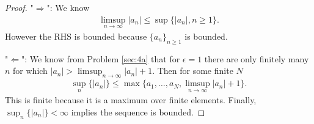 \documentclass[11pt,letterpaper]{article}
\begin{document}
\begin{proof}
"$\Rightarrow$": We know 
\begin{align*}
    \limsup_{n\to\infty} |a_n| \leq \sup \{|a_n|, n\geq 1\}.
\end{align*}
However the RHS is bounded because $\{a_n\}_{n\geq 1}$ is bounded.

"$\Leftarrow$": We know from Problem \ref{sec:4a} that for $\epsilon = 1$ there are only finitely many $n$ for which $|a_n|>\limsup_{n\to\infty} |a_n|+1$. Then for some finite $N$
\begin{align}
    \sup_{n} \{|a_n|\} \leq \max\{a_1,\dots,a_N,\limsup_{n\to\infty} |a_n|+1\}.
\end{align}
This is finite because it is a maximum over finite elements. Finally, $\sup_{n} \{|a_n|\}<\infty$ implies the sequence is bounded.

\end{proof}


\vfill
\printbibliography
\end{document}
